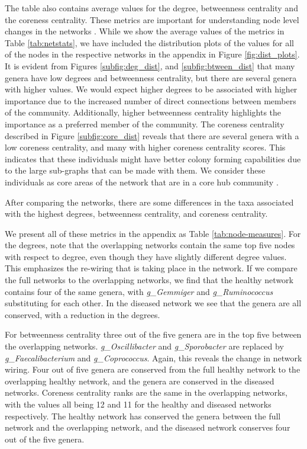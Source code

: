 The table also contains average values for the degree, betweenness centrality and the coreness centrality. These metrics are important for understanding node level changes in the networks \citep{Kuntal2018}. While we show the average values of the metrics in Table \ref{tab:netstats}, we have included the distribution plots of the values for all of the nodes in the respective networks in the appendix in Figure \ref{fig:dist_plots}. It is evident from Figures \ref{subfig:deg_dist}, and \ref{subfig:btween_dist} that many genera have low degrees and betweenness centrality, but there are several genera with higher values. We would expect higher degrees to be associated with higher importance due to the increased number of direct connections between members of the community. Additionally, higher betweenness centrality highlights the importance as a preferred member of the community. The coreness centrality described in Figure \ref{subfig:core_dist} reveals that there are several genera with a low coreness centrality, and many with higher coreness centrality scores. This indicates that these individuals might have better colony forming capabilities due to the large sub-graphs that can be made with them. We consider these individuals as core areas of the network that are in a core hub community \citep{Kuntal2018}.


After comparing the networks, there are some differences in the taxa associated with the highest degrees, betweenness centrality, and coreness centrality.

We present all of these metrics in the appendix as Table \ref{tab:node-measures}. For the degrees, note that the overlapping networks contain the same top five nodes with respect to degree, even though they have slightly different degree values. This emphasizes the re-wiring that is taking place in the network. If we compare the full networks to the overlapping networks, we find that the healthy network contains four of the same genera, with \textit{g\_Gemmiger} and \textit{g\_Ruminococcus} substituting for each other. In the diseased network we see that the genera are all conserved, with a reduction in the degrees. 

For betweenness centrality three out of the five genera are in the top five between the overlapping networks. \textit{g\_Oscillibacter} and \textit{g\_Sporobacter} are replaced by \textit{g\_Faecalibacterium} and \textit{g\_Coprococcus}. Again, this reveals the change in network wiring. Four out of five genera are conserved from the full healthy network to the overlapping healthy network, and the genera are conserved in the diseased networks. Coreness centrality ranks are the same in the overlapping networks, with the values all being 12 and 11 for the healthy and diseased networks respectively. The healthy network has conserved the genera between the full network and the overlapping network, and the diseased network conserves four out of the five genera. 

